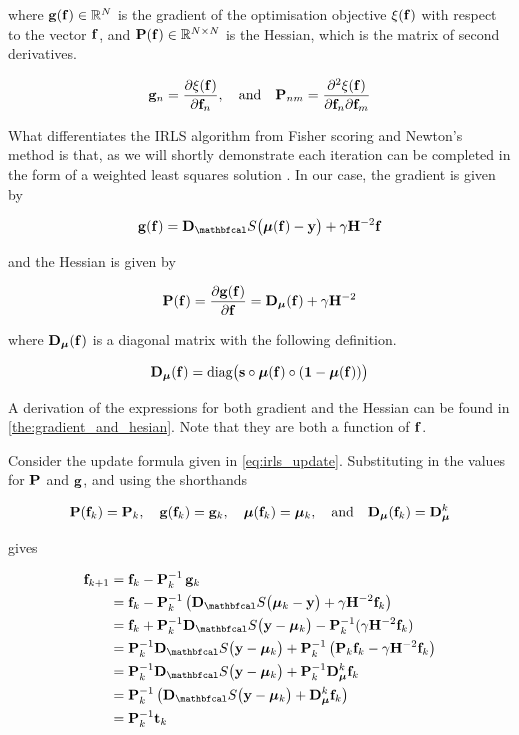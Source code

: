where $ \mathbf{g}(\mathbf{f}) \in \mathbb{R}^N$ is the gradient of the optimisation objective $\xi(\mathbf{f})$ with respect to the vector $\mathbf{f}$, and $\mathbf{P}(\mathbf{f}) \in \mathbb{R}^{N \times N}$ is the Hessian, which is the matrix of second derivatives. 

\begin{equation*}
    \mathbf{g}_n = \frac{\partial \xi(\mathbf{f})}{\partial \mathbf{f}_n}, \quad \text{and} \quad \mathbf{P}_{nm} = \frac{\partial^2 \xi(\mathbf{f})}{\partial \mathbf{f}_n \partial \mathbf{f}_m}
\end{equation*}

What differentiates the IRLS algorithm from Fisher scoring and Newton's method is that, as we will shortly demonstrate each iteration can be completed in the form of a weighted least squares solution \citep{Fan2020}. In our case, the gradient is given by 

\begin{equation}
    \g(\f) = \D_\St \big(\muu(\f) - \y\big) + \gamma \HH^{-2} \f
\end{equation}

and the Hessian is given by 

\begin{equation}
    \label{eq:logistic_gsr_P}
    \mathbf{P}(\mathbf{f}) = \frac{\partial \mathbf{g}(\mathbf{f})}{\partial \mathbf{f}} =  \mathbf{D}_{\boldsymbol{\mu}}(\mathbf{f}) + \gamma \mathbf{H}^{-2}
\end{equation}

where $\mathbf{D}_{\boldsymbol{\mu}}(\mathbf{f})$ is a diagonal matrix with the following definition. 

\begin{equation}
    \mathbf{D}_{\boldsymbol{\mu}}(\mathbf{f}) = \text{diag}\big(\mathbf{s} \circ \boldsymbol{\mu}(\mathbf{f}) \circ (\mathbf{1} - \boldsymbol{\mu}(\mathbf{f}))\big)
\end{equation}

A derivation of the expressions for both gradient and the Hessian can be found in \cref{the:gradient_and_hesian}. Note that they are both a function of $\mathbf{f}$. 

Consider the update formula given in \cref{eq:irls_update}. Substituting in the values for $\mathbf{P}$ and $\mathbf{g}$, and using the shorthands

\begin{equation*}
    \mathbf{P}(\mathbf{f}_k) = \mathbf{P}_k, \quad \mathbf{g}(\mathbf{f}_k) = \mathbf{g}_k, \quad \boldsymbol{\mu}(\mathbf{f}_k) = \boldsymbol{\mu}_k, \quad \text{and} \quad \mathbf{D}_{\boldsymbol{\mu}}(\mathbf{f}_k) = \mathbf{D}_{\boldsymbol{\mu}}^k
\end{equation*}

gives

\begin{align*}
    \f_{k+1} &= \f_k - \PP^{-1}_k \, \g_k\\
    &= \f_{k} - \PP^{-1}_k \left(\D_\St \big(\muu_k - \y\big) + \gamma \HH^{-2} \f_k\right) \\
    &= \f_k + \PP^{-1}_k \D_\St \big(\y - \muu_k\big) - \PP^{-1}_k (\gamma \HH^{-2} \f_k) \\
    &= \PP^{-1}_k \D_\St \big(\y - \muu_k \big) + \PP^{-1}_k \left(\PP_k \f_k - \gamma \HH^{-2} \f_k\right) \\
    &= \PP^{-1}_k \D_\St \big(\y - \muu_k \big) + \PP^{-1}_k \D_{\muu}^k\f_k  \\
    &= \PP^{-1}_k \left(\D_\St \big(\y - \muu_k \big) + \D_{\muu}^k\f_k \right) \\
    &= \PP^{-1}_k \tee_k
\end{align*}

